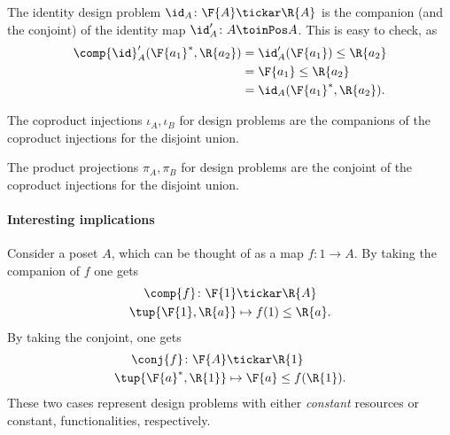 \begin{example}The identity design problem $\id_A\colon \F{A} \tickar \R{A}$ is the companion (and the conjoint) of the identity map $\id_A'\colon A \toinPos A$. This is easy to check, as
\begin{equation}
    \begin{aligned}
    \comp{\id}_A'(\F{a_1}^*,\R{a_2})&=\id_A'(\F{a_1})\leq \R{a_2}\\
    &=\F{a_1}\leq \R{a_2}\\
    &=\id_A(\F{a_1}^*,\R{a_2}).
    \end{aligned}
\end{equation}
\end{example}

\begin{example}The coproduct injections $\iota_A, \iota_B$ for design problems are the companions of the coproduct injections for the disjoint union.
\end{example}

\begin{example}The product projections $\pi_A, \pi_B$ for design problems are the conjoint of the coproduct injections for the disjoint union.
\end{example}


\paragraph{Interesting implications}
Consider a poset $A$, which can be thought of as a map $f\colon 1\to A$. By taking the companion of $f$ one gets
\begin{equation}
\begin{aligned}
    \comp{f}\colon \F{1}&\tickar \R{A}\\
    \tup{\F{1},\R{a}}&\mapsto f(1)\leq \R{a}.
\end{aligned}
\end{equation}
By taking the conjoint, one gets
\begin{equation}
\begin{aligned}
    \conj{f}\colon \F{A}&\tickar \R{1}\\
    \tup{\F{a}^*,\R{1}}&\mapsto \F{a}\leq f(\R{1}).
\end{aligned}
\end{equation}
These two cases represent design problems with either \emph{constant} resources or constant, functionalities, respectively.

